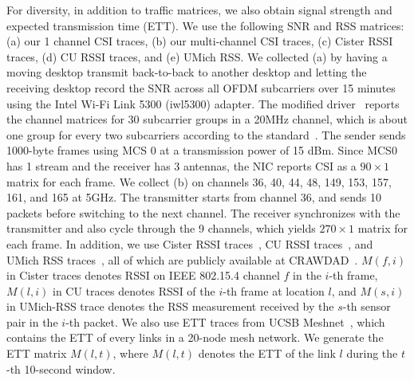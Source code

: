 For diversity, in addition to traffic matrices, we also obtain signal
strength and expected transmission time (ETT). %
We use the following SNR and RSS
matrices: (a) our 1 channel CSI traces, (b) our multi-channel CSI traces, (c) Cister RSSI traces, (d) CU
RSSI traces, and (e) UMich RSS. We collected (a) 
by having a moving desktop transmit back-to-back to another desktop and letting the receiving
desktop record the SNR across all OFDM subcarriers over 15 minutes
using the Intel Wi-Fi Link 5300 (iwl5300) adapter. The
modified driver~\cite{iwlagn} reports the channel matrices for 30
subcarrier groups in a 20MHz channel, which is about one group for every two subcarriers according to the standard~\cite{802.11n-2009}. The
sender sends 1000-byte frames using MCS 0 at a transmission power of
15 dBm. Since MCS0 has 1 stream and the receiver has 3 antennas, the
NIC reports CSI as a $90 \times 1$ matrix for each frame. 
We collect (b) on channels 36, 40, 44, 48, 149, 153, 157, 161, and 165 at
 5GHz. The transmitter starts from channel 36, and sends 10 packets before
 switching to the next channel. The receiver synchronizes with the
 transmitter and also cycle through the 9 channels, which yields $270
 \times 1$ matrix for each frame.
In addition, we use Cister RSSI traces~\cite{RSSI1}, CU RSSI
traces~\cite{RSSI2}, and UMich RSS traces~\cite{UMich-RSS}, all of
which are publicly
available at CRAWDAD~\cite{crawdad}. $M(f,i)$ in Cister traces denotes
RSSI on IEEE 802.15.4 channel $f$ in the $i$-th frame,
$M(l,i)$ in CU traces denotes RSSI of the $i$-th frame at location
$l$, and $M(s,i)$ in UMich-RSS trace denotes the RSS measurement 
received by the $s$-th sensor pair in the $i$-th packet.
We also use ETT traces from UCSB Meshnet~\cite{UCSB-Meshnet}, %
which contains the ETT of every links in a 20-node mesh network. 
We generate the ETT matrix $M(l,t)$, where $M(l,t)$ denotes the ETT of
the link $l$ during the $t$-th 10-second window.

